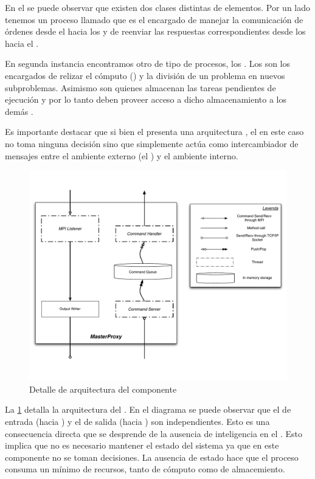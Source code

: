 En el \bend se puede observar que existen dos clases distintas de elementos.
Por un lado tenemos un proceso llamado \master que es el encargado de manejar
la comunicación de órdenes desde el \fend hacia los \ws y de reenviar las
respuestas correspondientes desde los \ws hacia el \fend.

En segunda instancia encontramos otro de tipo de procesos, los \ws. Los \ws
son los encargados de relizar el cómputo (\ssolving) y la división de un
problema en nuevos subproblemas. Asimismo son quienes almacenan las tareas
pendientes de ejecución y por lo tanto deben proveer acceso a dicho
almacenamiento a los demás \ws.

Es importante destacar que si bien el \bend presenta una arquitectura
\masterslave, el \master en este caso no toma ninguna decisión sino que
simplemente actúa como intercambiador de mensajes entre el ambiente externo
(el \fend) y el ambiente interno.

\begin{figure}[h!]
\centering
\includegraphics[scale=0.4]{graphs/master proxy detail}
\caption{Detalle de arquitectura del componente \master}
\label{fig:masterproxydetail}
\end{figure}

La \fig\ref{fig:masterproxydetail} detalla la arquitectura del \master. En el
diagrama se puede observar que el \datapath de entrada (\fend hacia \bend) y
el de salida (\bend hacia \fend) son independientes. Esto es una consecuencia
directa que se desprende de la ausencia de inteligencia en el \master. Esto
implica que no es necesario mantener el estado del sistema ya que en este
componente no se toman decisiones. La ausencia de estado hace que el proceso
\master consuma un mínimo de recursos, tanto de cómputo como de almacemiento.

